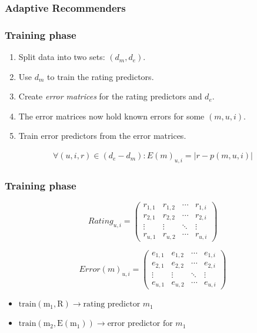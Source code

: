 \documentclass[screen]{beamer}
\begin{document}
\begin{frame}
  \frametitle{Adaptive Recommenders}
  
\end{frame}

\begin{frame}
  \frametitle{Training phase}
  
  \begin{enumerate}
    \item Split data into two sets: $(d_m,d_e)$.
    \item Use $d_m$ to train the rating predictors.
    \item Create \emph{error matrices} for the rating predictors and $d_e$. 
    \item The error matrices now hold known errors for some $(m,u,i)$.
    \item Train error predictors from the error matrices.
  \end{enumerate}
  
  \begin{eqnarray}
    \forall (u,i,r) \in (d_e - d_m): E(m)_{u,i} = |r - p(m,u,i)|
  \end{eqnarray}
\end{frame}

\begin{frame}
  \frametitle{Training phase}
  
  \begin{equation*}
     Rating_{u,i} =
     \begin{pmatrix}
      r_{1,1} & r_{1,2} & \cdots & r_{1,i} \\
      r_{2,1} & r_{2,2} & \cdots & r_{2,i} \\
      \vdots  & \vdots  & \ddots & \vdots  \\
      r_{u,1} & r_{u,2} & \cdots & r_{u,i}
     \end{pmatrix}
    \end{equation*}

  \vspace{1em}
  
    \begin{equation*}
     Error(m)_{u,i} =
     \begin{pmatrix}
        e_{1,1} & e_{1,2} & \cdots & e_{1,i} \\
        e_{2,1} & e_{2,2} & \cdots & e_{2,i} \\
        \vdots  & \vdots  & \ddots & \vdots  \\
        e_{u,1} & e_{u,2} & \cdots & e_{u,i}
     \end{pmatrix}
    \end{equation*}
    
    \vspace{1em}
    \begin{itemize}
      \item $\mathrm{train(m_1, R)} \rightarrow \text{rating predictor } m_1$
      \item $\mathrm{train(m_2, E(m_1))} \rightarrow \text{error predictor for } m_1$
    \end{itemize}
\end{frame}
\end{document}
